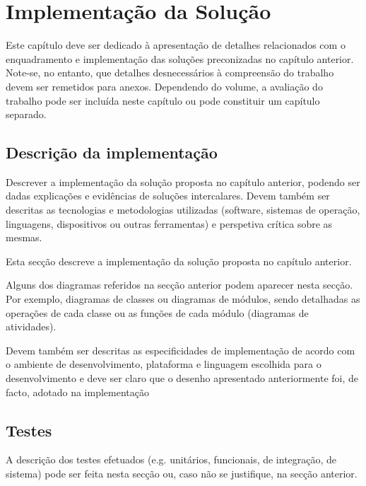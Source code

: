 % 
\chapter{Implementação da Solução} 
\label{chap:Impl} %

Este capítulo deve ser dedicado à apresentação de detalhes relacionados com o enquadramento e implementação das soluções preconizadas no capítulo anterior. Note-se, no entanto, que detalhes desnecessários à compreensão do trabalho devem ser remetidos para anexos. Dependendo do volume, a avaliação do trabalho pode ser incluída neste capítulo ou pode constituir um capítulo separado.


\section{Descrição da implementação} 
\label{sec:desc} %

Descrever a implementação da solução proposta no capítulo anterior, podendo ser dadas explicações e evidências de soluções intercalares. Devem também ser descritas as tecnologias e metodologias utilizadas (software, sistemas de operação, linguagens, dispositivos ou outras ferramentas) e perspetiva crítica sobre as mesmas. 

Esta secção descreve a implementação da solução proposta no capítulo anterior. 

Alguns dos diagramas referidos na secção anterior podem aparecer nesta secção. Por exemplo, diagramas de classes ou diagramas de módulos, sendo detalhadas as operações de cada classe ou as funções de cada módulo (diagramas de atividades). 

Devem também ser descritas as especificidades de implementação de acordo com o ambiente de desenvolvimento, plataforma e linguagem escolhida para o desenvolvimento e deve ser claro que o desenho apresentado anteriormente foi, de facto, adotado na implementação

\section{Testes} 

A descrição dos testes efetuados (e.g. unitários, funcionais, de integração, de sistema) pode ser feita nesta secção ou, caso não se justifique, na secção anterior.

